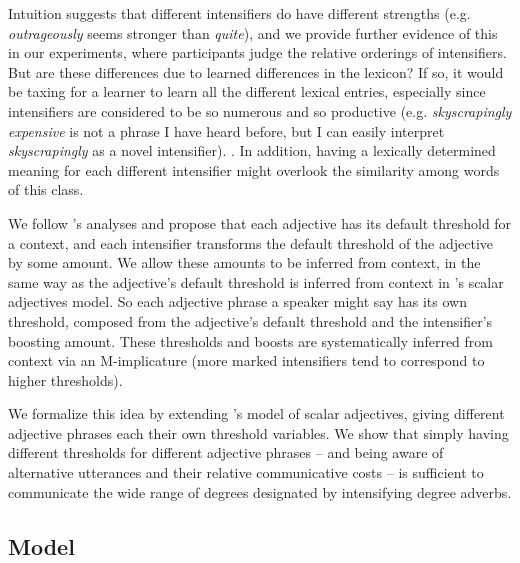 \documentclass[10pt,letterpaper]{article}
\newcommand{\w}[1]{\emph{#1}}
\begin{document}

Intuition suggests that different intensifiers do have different strengths (e.g. \w{outrageously} seems stronger than \w{quite}), and we provide further evidence of this in our experiments, where participants judge the relative orderings of intensifiers. But are these differences due to learned differences in the lexicon?
If so, it would be taxing for a learner to learn all the different lexical entries, especially since intensifiers are considered to be so numerous and so productive (e.g. \w{skyscrapingly expensive} is not a phrase I have heard before, but I can easily interpret \w{skyscrapingly} as a novel intensifier).
\cite{bolinger}.
In addition, having a lexically determined meaning for each different intensifier might overlook the similarity among words of this class.

We follow 's analyses and propose that each adjective has its default threshold for a context, and each intensifier transforms the default threshold of the adjective by some amount. We allow these amounts to be inferred from context, in the same way as the adjective's default threshold is inferred from context in 's scalar adjectives model.
So each adjective phrase a speaker might say has its own threshold, composed from the adjective's default threshold and the intensifier's boosting amount. These thresholds and boosts are systematically inferred from context via an M-implicature (more marked intensifiers tend to correspond to higher thresholds).

We formalize this idea by extending 's model of scalar adjectives, giving different adjective phrases each their own threshold variables. We show that simply having different thresholds for different adjective phrases -- and being aware of alternative utterances and their relative communicative costs -- is sufficient to communicate the wide range of degrees designated by intensifying degree adverbs.

\subsection{Model}
\end{document}
